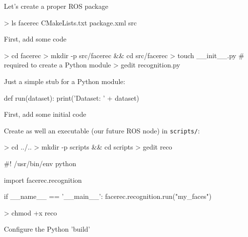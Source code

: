 \documentclass[compress]{beamer}
\begin{document}
{\begin{frame}[fragile]{Let's create a proper ROS package}

\pause
\begin{shcode}
> ls facerec
CMakeLists.txt  package.xml  src
\end{shcode}

\end{frame}

\begin{frame}[fragile]{First, add some code}

\begin{shcode}
> cd facerec
> mkdir -p src/facerec && cd src/facerec
> touch __init__.py # required to create a Python module
> gedit recognition.py
\end{shcode}
\pause

Just a simple stub for a Python module:

\begin{pythoncode}
def run(dataset):
    print('Dataset: ' + dataset)
\end{pythoncode}

\end{frame}

\begin{frame}[fragile]{First, add some initial code}

Create as well an executable (our future ROS node) in \texttt{scripts/}:

\begin{shcode}
> cd ../..
> mkdir -p scripts && cd scripts
> gedit reco
\end{shcode}
\pause

\begin{pythoncode}
#! /usr/bin/env python

import facerec.recognition

if __name__ == '__main__':
    facerec.recognition.run("my_faces")
\end{pythoncode}

\pause

\begin{shcode}
> chmod +x reco
\end{shcode}
\end{frame}

\begin{frame}[fragile]{Configure the Python 'build'}


\end{frame}}
\end{document}
